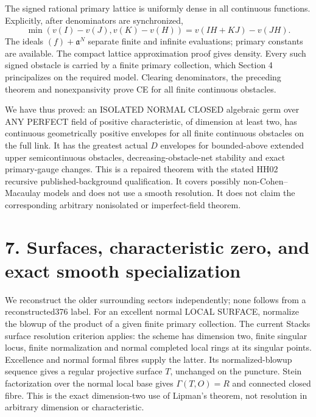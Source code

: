 \documentclass[11pt]{article}
\begin{document}
The signed rational primary lattice is uniformly dense in all continuous functions. Explicitly, after denominators are synchronized,
\[
\min(v(I)-v(J),v(K)-v(H))=v(IH+KJ)-v(JH).
\]
The ideals \((f)+\mathfrak a^N\) separate finite and infinite evaluations; primary constants are available. The compact lattice approximation proof gives density. Every such signed obstacle is carried by a finite primary collection, which Section 4 principalizes on the required model. Clearing denominators, the preceding theorem and nonexpansivity prove CE for all finite continuous obstacles.

We have thus proved: an ISOLATED NORMAL CLOSED algebraic germ over ANY PERFECT field of positive characteristic, of dimension at least two, has continuous geometrically positive envelopes for all finite continuous obstacles on the full link. It has the greatest actual \(D\) envelopes for bounded-above extended upper semicontinuous obstacles, decreasing-obstacle-net stability and exact primary-gauge changes. This is a repaired theorem with the stated HH02 recursive published-background qualification. It covers possibly non-Cohen--Macaulay models and does not use a smooth resolution. It does not claim the corresponding arbitrary nonisolated or imperfect-field theorem.

\section{7. Surfaces, characteristic zero, and exact smooth specialization}

We reconstruct the older surrounding sectors independently; none follows from a reconstructed376 label. For an excellent normal LOCAL SURFACE, normalize the blowup of the product of a given finite primary collection. The current Stacks surface resolution criterion applies: the scheme has dimension two, finite singular locus, finite normalization and normal completed local rings at its singular points. Excellence and normal formal fibres supply the latter. Its normalized-blowup sequence gives a regular projective surface \(T\), unchanged on the puncture. Stein factorization over the normal local base gives \(\Gamma(T,O)=R\) and connected closed fibre. This is the exact dimension-two use of Lipman's theorem, not resolution in arbitrary dimension or characteristic.
\end{document}

